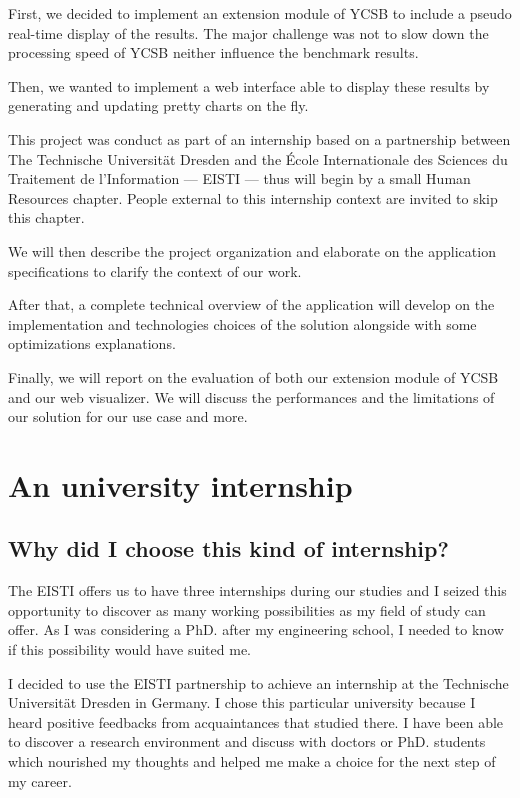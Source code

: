 \documentclass[a4paper,11pt]{report}
\begin{document}
First, we decided to implement an extension module of YCSB to include a pseudo real-time display of the results. The major challenge was not to slow down the processing speed of YCSB neither influence the benchmark results. 

Then, we wanted to implement a web interface able to display these results by generating and updating pretty charts on the fly.

\bigskip

This project was conduct as part of an internship based on a partnership between The Technische Universität Dresden and the École Internationale des Sciences du Traitement de l'Information --- EISTI --- thus will begin by a small Human Resources chapter. People external to this internship context are invited to skip this chapter.

We will then describe the project organization and elaborate on the application specifications to clarify the context of our work.

After that, a complete technical overview of the application will develop on  the implementation and technologies choices of the solution alongside with some optimizations explanations.

Finally, we will report on the evaluation of both our extension module of YCSB and our web visualizer. We will discuss the performances and the limitations of our solution for our use case and more.

\newpage

\chapter{An university internship}\label{partnership}

\section{Why did I choose this kind of internship?}

The EISTI offers us to have three internships during our studies and I seized this opportunity to discover as many working possibilities as my field of study can offer. As I was considering a PhD. after my engineering school, I needed to know if this possibility would have suited me.

\bigskip

I decided to use the EISTI partnership to achieve an internship at the Technische Universität Dresden in Germany. I chose this particular university because I heard positive feedbacks from acquaintances that studied there. I have been able to discover a research environment and discuss with doctors or PhD. students which nourished my thoughts and helped me make a choice for the next step of my career.
\end{document}

